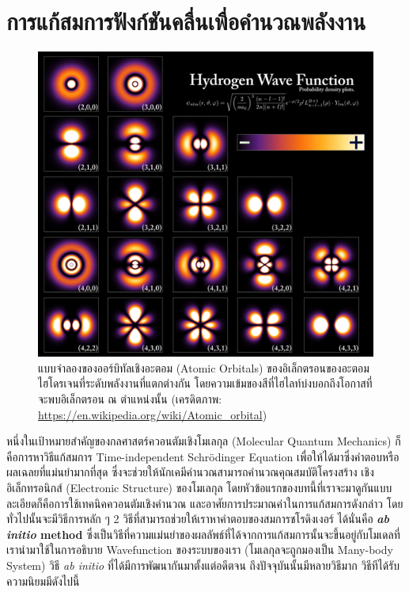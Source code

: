 \section{การแก้สมการฟังก์ชันคลื่นเพื่อคำนวณพลังงาน}
\label{sec:wavefunc_ener}

\begin{figure}[htbp]
    \centering
    \includegraphics[width=0.9\linewidth]{fig/hydrogen_density_plots.png}
    \caption{แบบจำลองของออร์บิทัลเชิงอะตอม (Atomic Orbitals) ของอิเล็กตรอนของอะตอมไฮโดรเจนที่ระดับพลังงานที่แตกต่างกัน
    โดยความเข้มของสีที่ไฮไลท์บ่งบอกถึงโอกาสที่จะพบอิเล็กตรอน ณ ตำแหน่งนั้น 
    (เครดิตภาพ: \url{https://en.wikipedia.org/wiki/Atomic_orbital})}
    \label{fig:hydrogen_density}
\end{figure}

หนึ่งในเป้าหมายสำคัญของกลศาสตร์ควอนตัมเชิงโมเลกุล (Molecular Quantum Mechanics) ก็คือการหาวิธีแก้สมการ Time-independent 
Schr\"{o}dinger Equation เพื่อให้ได้มาซึ่งคำตอบหรือผลเฉลยที่แม่นยำมากที่สุด ซึ่งจะช่วยให้นักเคมีคำนวณสามารถคำนวณคุณสมบัติโครงสร้าง%
เชิงอิเล็กทรอนิกส์ (Electronic Structure) ของโมเลกุล โดยหัวข้อแรกของบทนี้ที่เราจะมาดูกันแบบละเอียดก็คือการใช้เทคนิคควอนตัมเชิงคำนวณ%
และอาศัยการประมาณค่าในการแก้สมการดังกล่าว โดยทั่วไปนั้นจะมีวิธีการหลัก ๆ 2 วิธีที่สามารถช่วยให้เราหาคำตอบของสมการชโรดิงเงอร์ ได้นั่นคือ 
\textbf{\textit{ab initio} method} ซึ่งเป็นวิธีที่ความแม่นยำของผลลัพธ์ที่ได้จากการแก้สมการนั้นจะขึ้นอยู่กับโมเดลที่เรานำมาใช้ในการอธิบาย 
Wavefunction ของระบบของเรา (โมเลกุลจะถูกมองเป็น Many-body System) วิธี \textit{ab initio} ที่ได้มีการพัฒนากันมาตั้งแต่อดีตจน%
ถึงปัจจุบันนั้นมีหลายวิธีมาก\autocite{friesner2005,helgaker2014,jensen2017} วิธีทีได้รับความนิยมมีดังไปนี้

